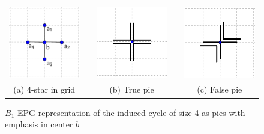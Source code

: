 \begin{figure}[htb]
  \centering
  \begin{tabular}{c c c c c }
    \includegraphics[width=3.5cm]{img/disposicaoTortaGrid3}    
    & &\includegraphics[width=3.5cm]{img/truePieGrid} 
    & &
 \includegraphics[width=3.5cm]{img/falsePieGrid} \\%
    {\footnotesize (a) 4-star in grid}  & &  {\footnotesize (b) True pie} & & {\footnotesize (c) False pie} %
  \end{tabular}
  \caption{$B_{1}$-EPG representation of the induced cycle of size 4 as pies with emphasis in center $b$}\label{fig:piesInGrid}
\end{figure} 